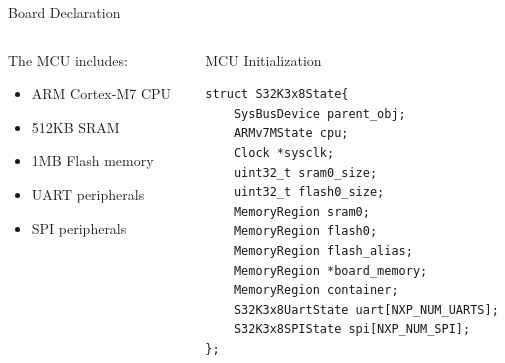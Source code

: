 \documentclass{beamer}
\begin{document}
\begin{frame}[fragile]{Board Declaration}
    \begin{columns}
        \begin{column}{0.5\textwidth}
            The MCU includes:
            \begin{itemize}
                \item ARM Cortex-M7 CPU
                \item 512KB SRAM
                \item 1MB Flash memory
                \item UART peripherals
                \item SPI peripherals
            \end{itemize}
        \end{column}
        \begin{column}{0.5\textwidth}
            \begin{block}{MCU Initialization}
                    \begin{footnotesize}
                        \begin{verbatim}
struct S32K3x8State{
    SysBusDevice parent_obj;
    ARMv7MState cpu;
    Clock *sysclk;
    uint32_t sram0_size;    
    uint32_t flash0_size;  
    MemoryRegion sram0;
    MemoryRegion flash0;
    MemoryRegion flash_alias;
    MemoryRegion *board_memory;
    MemoryRegion container;
    S32K3x8UartState uart[NXP_NUM_UARTS];
    S32K3x8SPIState spi[NXP_NUM_SPI];
};
                        \end{verbatim}
                    \end{footnotesize}
            \end{block}
        \end{column}
    \end{columns}
\end{frame}
\end{document}
